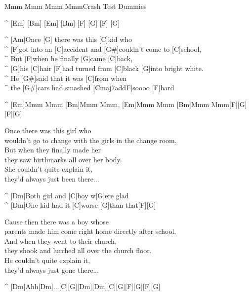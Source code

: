 \begin{song}{Mmm Mmm Mmm Mmm}{Crash Test Dummies}

\begin{guitar}
^ [Em] [Bm] [Em] [Bm] [F] [G] [F] [G]\\

\end{guitar}
\begin{guitar}
^ [Am]Once [G] there was this [C]kid who\\
^ [F]got into an [C]accident and [G#]couldn't come to [C]school,\\
^ But [F]when he finally [G]came [C]back,\\
^ [G]his [C]hair [F]had turned from [C]black [G]into bright white.\\
^ He [G#]said that it was [C]from when\\
^ the [G#]cars had smashed [Cmaj7addF]soooo [F]hard\\
\end{guitar}

\begin{guitar}
^ [Em]Mmm Mmm [Bm]Mmm Mmm, [Em]Mmm Mmm [Bm]Mmm Mmm[F][G][F][G]\\
\end{guitar}

\begin{guitar}
Once there was this girl who\\
wouldn't go to change with the girls in the change room,\\
But when they finally made her\\
they saw birthmarks all over her body.\\
She couldn't quite explain it,\\
they'd always just been there...\\
\end{guitar}


\begin{guitar}
^ [Dm]Both girl and [C]boy w[G]ere glad\\
^ [Dm]One kid had it [C]worse [G]than that[F][G]\\
\end{guitar}

\begin{guitar}
Cause then there was a boy whose\\
parents made him come right home directly after school,\\
And when they went to their church,\\
they shook and lurched all over the church floor.\\
He couldn't quite explain it,\\
they'd always just gone there...\\
\end{guitar}


\begin{guitar}
^ [Dm]Ahh[Dm]...[C][G][Dm][Dm][C][G][F][G][F][G]\\
\end{guitar}
\end{song}

